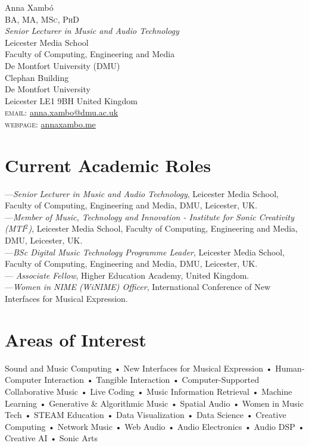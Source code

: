 \documentclass[10pt, a4paper]{article}
\begin{document}
{\Huge Anna Xambó}\\[0.1cm]
\textsc{BA, MA, MSc, PhD}\\[0.9cm]
\emph{Senior Lecturer in Music and Audio Technology}\\
Leicester Media School\\
Faculty of Computing, Engineering and Media\\
De Montfort University (DMU)\\
Clephan Building \\
De Montfort University\\
Leicester LE1 9BH United Kingdom\\[.2cm]
\textsc{email}: \href{mailto:anna.xambo@dmu.ac.uk}{anna.xambo@dmu.ac.uk}\\
\textsc{webpage}: \href{http://annaxambo.me/}{annaxambo.me}

\section*{Current Academic Roles}
---\emph{Senior Lecturer in Music and Audio Technology}, Leicester Media School, Faculty of Computing, Engineering and Media, DMU, Leicester, UK.\\
---\emph{Member of Music, Technology and Innovation - Institute for Sonic Creativity (MTI${^2}$)}, Leicester Media School, Faculty of Computing, Engineering and Media, DMU, Leicester, UK.\\
---\emph{BSc Digital Music Technology Programme Leader}, Leicester Media School, Faculty of Computing, Engineering and Media, DMU, Leicester, UK.\\
---\emph{ Associate Fellow}, Higher Education Academy, United Kingdom.\\
---\emph{Women in NIME (WiNIME) Officer}, International Conference of New Interfaces for Musical Expression.
\section*{Areas of Interest}
Sound and Music Computing • New Interfaces for Musical Expression • Human-Computer Interaction • Tangible Interaction • Computer-Supported Collaborative Music • Live Coding • Music Information Retrieval • Machine Learning • Generative \& Algorithmic Music • Spatial Audio • Women in Music Tech • STEAM Education • Data Visualization • Data Science • Creative Computing • Network Music • Web Audio • Audio Electronics • Audio DSP • Creative AI • Sonic Arts
\end{document}
